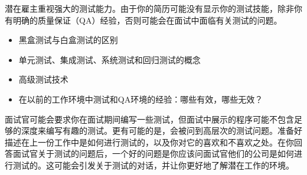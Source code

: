 
潜在雇主重视强大的测试能力。由于你的简历可能没有显示你的测试技能，除非你有明确的质量保证（QA）经验，否则可能会在面试中面临有关测试的问题。


\begin{itemize}
\item
黑盒测试与白盒测试的区别

\item
单元测试、集成测试、系统测试和回归测试的概念

\item
高级测试技术

\item
在以前的工作环境中测试和QA环境的经验：哪些有效，哪些无效？
\end{itemize}


面试官可能会要求你在面试期间编写一些测试，但面试中展示的程序可能不包含足够的深度来编写有趣的测试。更有可能的是，会被问到高层次的测试问题。准备好描述在上一份工作中是如何进行测试的，以及你对它的喜欢和不喜欢之处。在你回答面试官关于测试的问题后，一个好的问题是你应该问面试官他们的公司是如何进行测试的。这可能会引发关于测试的对话，并让你更好地了解潜在工作的环境。


